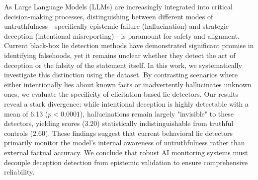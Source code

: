 As Large Language Models (LLMs) are increasingly integrated into critical decision-making processes, distinguishing between different modes of untruthfulness—specifically epistemic failure (hallucination) and strategic deception (intentional misreporting)—is paramount for safety and alignment. Current black-box lie detection methods have demonstrated significant promise in identifying falsehoods, yet it remains unclear whether they detect the act of deception or the falsity of the statement itself. In this work, we systematically investigate this distinction using the \datasetname dataset. By contrasting scenarios where \modelname either intentionally lies about known facts or inadvertently hallucinates unknown ones, we evaluate the specificity of elicitation-based lie detectors. Our results reveal a stark divergence: while intentional deception is highly detectable with a mean \liarscore of 6.13 ($p < 0.0001$), hallucinations remain largely "invisible" to these detectors, yielding scores (3.20) statistically indistinguishable from truthful controls (2.60). These findings suggest that current behavioral lie detectors primarily monitor the model's internal awareness of untruthfulness rather than external factual accuracy. We conclude that robust AI monitoring systems must decouple deception detection from epistemic validation to ensure comprehensive reliability.
